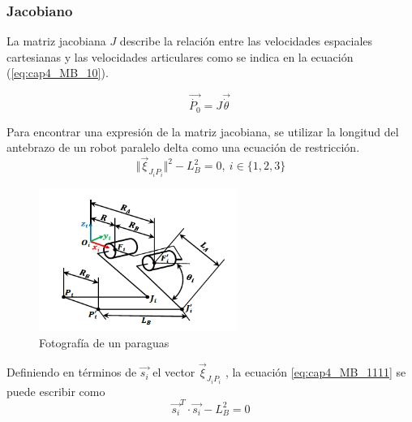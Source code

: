         \subsubsection{Jacobiano}

        La matriz jacobiana $J$ describe la relación entre las velocidades espaciales cartesianas y las velocidades articulares como se indica en la ecuación (\ref{eq:cap4_MB_10}).

        \begin{equation} 
            \overrightarrow{\dot{P_{0}}}=J\overrightarrow{\dot{ \theta }}~ 
            \label{eq:cap4_MB_10}
        \end{equation}  
   
        Para encontrar una expresión de la matriz jacobiana, se utilizar la longitud del antebrazo de un robot paralelo delta como una ecuación de restricción.
        \begin{equation} 
            \Vert {\overrightarrow{\xi}}_{J_iP_i}\Vert^2 - L_B^2=0 , ~i \in \{1,2,3\}
            \label{eq:cap4_MB_1111}
        \end{equation}
        
            
                \begin{figure}[htb]
                 \centering
                 \includegraphics[width=0.55\linewidth]{Main/Chapter4/Images4/Metodo_B_Modelacion_Cinematica_Posicion_5.png}
                  \caption{Fotografía de un paraguas}
                  \label{f:Cap4_Metodo_B_Modelacion_Cinematica_Posicion_5}
            \end{figure}  
        
                    \newpage

        
        Definiendo en términos de $\overrightarrow{s_i}$ el vector $\overrightarrow{\xi}_{J_iP_i}$ , la ecuación \ref{eq:cap4_MB_1111} se puede escribir como
        \begin{equation} 
            \overrightarrow{s_{i}}^T \cdot \overrightarrow{s_{i}} - L_{B}^{2} = 0
            \label{eq:cap4_MB_11}
        \end{equation} 

